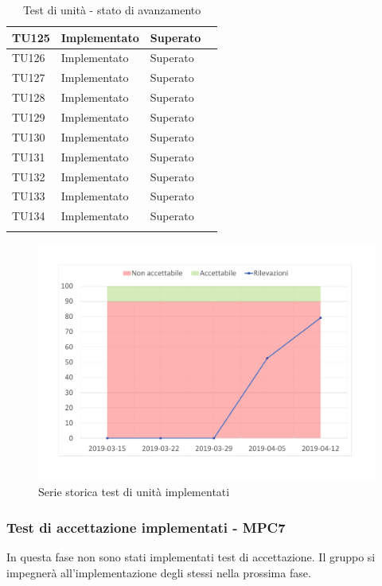 \begin{longtable}{|>{\centering\arraybackslash}m{1.6cm}|>{\centering\arraybackslash}m{6.41cm}|>{\centering\arraybackslash}m{3.1cm}| c |}
	TU125 & Implementato & Superato  \\ \hline
	TU126 & Implementato & Superato  \\ \hline
	TU127 & Implementato & Superato  \\ \hline
	TU128 & Implementato & Superato  \\ \hline
	TU129 & Implementato & Superato  \\ \hline
	TU130 & Implementato & Superato  \\ \hline
	TU131 & Implementato & Superato  \\ \hline
	TU132 & Implementato & Superato  \\ \hline
	TU133 & Implementato & Superato  \\ \hline
	TU134 & Implementato & Superato  \\ \hline
	\caption{Test di unità - stato di avanzamento}
\end{longtable}

\begin{figure}[H]
	\centering
	\includegraphics[scale=0.6]{images/resoconto/MPC6Chart.pdf}
	\caption{Serie storica test di unità implementati}	
\end{figure}

\subsubsection{Test di accettazione implementati - MPC7}
In questa fase non sono stati implementati test di accettazione.
Il gruppo si impegnerà all'implementazione degli stessi nella prossima fase.
\newpage
